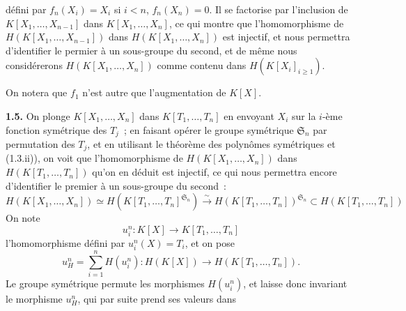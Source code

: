 défini par \(f_n(X_i)=X_i\) si \(i<n\), \(f_n(X_n)=0\). Il se factorise par l'inclusion de \(K[X_1,\ldots,X_{n-1}]\) dans \(K[X_1,\ldots,X_n]\), ce qui montre que l'homomorphisme de \(H(K[X_1,\ldots,X_{n-1}])\) dans \(H(K[X_1,\ldots,X_n])\) est injectif, et nous permettra d'identifier le permier à un sous-groupe du second, et de même nous considérerons \(H(K[X_1,\ldots,X_n])\) comme contenu dans \(H(K[X_i]_{i\geq 1})\).

On notera que \(f_1\) n'est autre que l'augmentation de \(K[X]\).

\textbf{1.5.} On plonge \(K[X_1,\ldots,X_n]\) dans \(K[T_1,\ldots,T_n]\) en envoyant \(X_i\) sur la \(i\)-ème fonction symétrique des \(T_j\)~; en faisant opérer le groupe symétrique \(\mathfrak S_n\) par permutation des \(T_j\), et en utilisant le théorème des polynômes symétriques et (1.3.ii)), on voit que l'homomorphisme de \(H(K[X_1,\ldots,X_n])\) dans \(H(K[T_1,\ldots,T_n])\) qu'on en déduit est injectif, ce qui nous permettra encore d'identifier le premier à un sous-groupe du second~:
\[
  H(K[X_1,\ldots,X_n])\simeq H(K[T_1,\ldots,T_n]^{\mathfrak S_n})\xrightarrow{\sim} H(K[T_1,\ldots,T_n])^{\mathfrak S_n}\subset H(K[T_1,\ldots,T_n])
\]%
On note
\[
  u_i^n:K[X]\longrightarrow K[T_1,\ldots,T_n]
\]
l'homomorphisme défini par \(u_i^n(X)=T_i\), et on pose
\[
  u_H^n=\sum_{i=1}^n H(u_i^n):H(K[X])\longrightarrow H(K[T_1,\ldots,T_n]).
\]
Le groupe symétrique permute les morphismes \(H(u_i^n)\), et laisse donc invariant le morphisme \(u_H^n\), qui par suite prend ses valeurs dans
